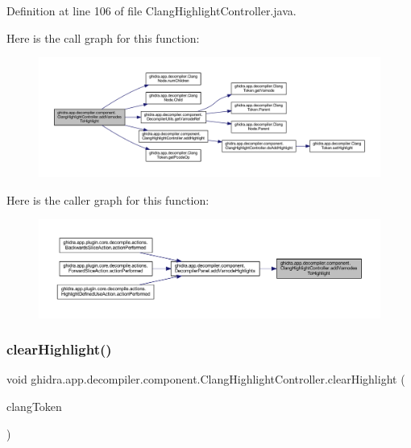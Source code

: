 Definition at line 106 of file Clang\+Highlight\+Controller.\+java.

Here is the call graph for this function\+:
\nopagebreak
\begin{figure}[H]
\begin{center}
\leavevmode
\includegraphics[width=350pt]{classghidra_1_1app_1_1decompiler_1_1component_1_1_clang_highlight_controller_a415977d3fa133edd37c344be0371cfcb_cgraph}
\end{center}
\end{figure}
Here is the caller graph for this function\+:
\nopagebreak
\begin{figure}[H]
\begin{center}
\leavevmode
\includegraphics[width=350pt]{classghidra_1_1app_1_1decompiler_1_1component_1_1_clang_highlight_controller_a415977d3fa133edd37c344be0371cfcb_icgraph}
\end{center}
\end{figure}
\mbox{\label{classghidra_1_1app_1_1decompiler_1_1component_1_1_clang_highlight_controller_a059003e77f6c6d6ecd7727c6840aefb8}} 
\subsubsection{\texorpdfstring{clearHighlight()}{clearHighlight()}}
{\footnotesize\ttfamily void ghidra.\+app.\+decompiler.\+component.\+Clang\+Highlight\+Controller.\+clear\+Highlight (\begin{DoxyParamCaption}\item[{\mbox{\hyperlink{classghidra_1_1app_1_1decompiler_1_1_clang_token}{Clang\+Token}}}]{clang\+Token }\end{DoxyParamCaption})\hspace{0.3cm}{\ttfamily [inline]}}



